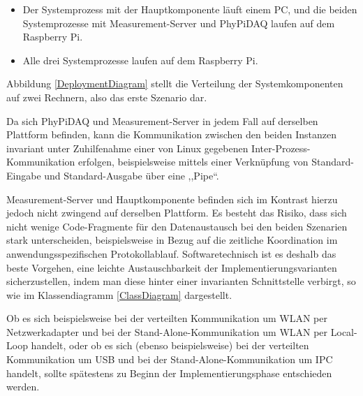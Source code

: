 \documentclass[parskip=full]{scrartcl}
\begin{document}
\begin{itemize}
	\item Der Systemprozess mit der Hauptkomponente läuft einem PC, und die beiden Systemprozesse mit Measurement-Server und PhyPiDAQ laufen auf dem Raspberry Pi. 
	\item Alle drei Systemprozesse laufen auf dem Raspberry Pi.
\end{itemize}

Abbildung \ref{DeploymentDiagram} stellt die Verteilung der Systemkomponenten auf zwei Rechnern, also das erste Szenario dar.

Da sich PhyPiDAQ und Measurement-Server in jedem Fall auf derselben Plattform befinden, kann die Kommunikation zwischen den beiden Instanzen invariant unter Zuhilfenahme einer von Linux gegebenen  Inter-Prozess-Kommunikation erfolgen, beispielsweise mittels einer Verknüpfung von Standard-Eingabe und Standard-Ausgabe über eine ,,Pipe``.

Measurement-Server und Hauptkomponente befinden sich im Kontrast hierzu jedoch nicht zwingend auf derselben Plattform. Es besteht das Risiko, dass sich nicht wenige Code-Fragmente für den Datenaustausch bei den beiden Szenarien stark unterscheiden, beispielsweise in Bezug auf die zeitliche Koordination im anwendungsspezifischen Protokollablauf. Softwaretechnisch ist es deshalb das beste Vorgehen, eine leichte Austauschbarkeit der Implementierungsvarianten sicherzustellen, indem man diese hinter einer invarianten Schnittstelle verbirgt, so wie im Klassendiagramm \ref{ClassDiagram} dargestellt.

Ob es sich beispielsweise bei der verteilten Kommunikation um WLAN per Netzwerkadapter und bei der \gls{Stand-Alone-Kommunikation} um WLAN per \gls{Local-Loop} handelt, oder ob es sich (ebenso beispielsweise) bei der verteilten Kommunikation um USB und bei der Stand-Alone-Kommunikation um IPC handelt, sollte spätestens zu Beginn der Implementierungsphase entschieden werden.  
\end{document}
